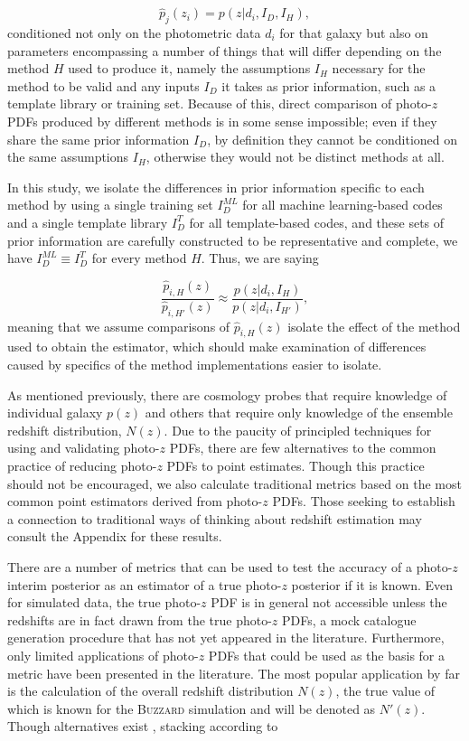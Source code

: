 \documentclass[usenatbib]{mn2e}
\begin{document}
\begin{equation}
\hat{p}_{j}(z_{i}) = p(z | d_{i}, I_{D}, I_{H}),
\end{equation}
conditioned not only on the photometric data $d_{i}$ for that galaxy but also on parameters encompassing a number of things that will differ depending on the method $H$ used to produce it, namely the assumptions $I_{H}$ necessary for the method to be valid and any inputs $I_{D}$ it takes as prior information, such as a template library or training set. 
Because of this, direct comparison of photo-$z$ PDFs produced by different methods is in some sense impossible; even if they share the same prior information $I_{D}$, by definition they cannot be conditioned on the same assumptions $I_{H}$, otherwise they would not be distinct methods at all.

In this study, we isolate the differences in prior information specific to each method by using a single training set $I_{D}^{ML}$ for all machine learning-based codes and a single template library $I_{D}^{T}$ for all template-based codes, and these sets of prior information are carefully constructed to be representative and complete, we have $I_{D}^{ML}\equiv I_{D}^{T}$ for every method $H$. 
Thus, we are saying

\begin{equation}
\frac{\hat{p}_{i, H}(z)}{\hat{p}_{i, H'}(z)} \approx \frac{p(z | d_{i}, I_{H})}{p(z | d_{i}, I_{H'})},
\end{equation}
meaning that we assume comparisons of $\hat{p}_{i, H}(z)$ isolate the effect of the method used to obtain the estimator, which should make examination of differences caused by specifics of the method implementations easier to isolate.

As mentioned previously, there are cosmology probes that require knowledge of individual galaxy $p(z)$ and others that require only knowledge of the ensemble redshift distribution, $N(z)$.  
Due to the paucity of principled techniques for using and validating photo-$z$ PDFs, there are few alternatives to the common practice of reducing photo-$z$ PDFs to point estimates. 
Though this practice should not be encouraged, we also calculate traditional metrics based on the most common point estimators derived from photo-$z$ PDFs.  
Those seeking to establish a connection to traditional ways of thinking about redshift estimation may consult the Appendix for these results.  

There are a number of metrics that can be used to test the accuracy of a photo-$z$ interim posterior as an estimator of a true photo-$z$ posterior if it is known.
Even for simulated data, the true photo-$z$ PDF is in general not accessible unless the redshifts are in fact drawn from the true photo-$z$ PDFs, a mock catalogue generation procedure that has not yet appeared in the literature. 
Furthermore, only limited applications of photo-$z$ PDFs that could be used as the basis for a metric have been presented in the literature. 
The most popular application by far is the calculation of the overall redshift distribution $N(z)$, the true value of which is known for the \textsc{Buzzard} simulation and will be denoted as $N'(z)$. 
Though alternatives exist \citep{Malz:chippr}, stacking according to
\end{document}
